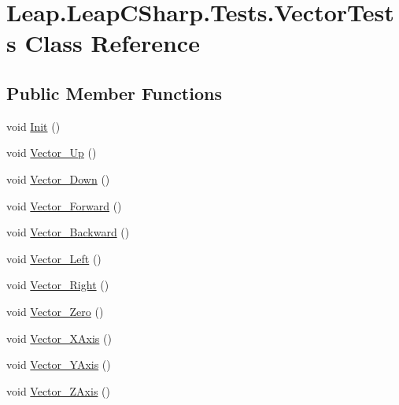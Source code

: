 \hypertarget{class_leap_1_1_leap_c_sharp_1_1_tests_1_1_vector_tests}{}\section{Leap.\+Leap\+C\+Sharp.\+Tests.\+Vector\+Tests Class Reference}
\label{class_leap_1_1_leap_c_sharp_1_1_tests_1_1_vector_tests}
\subsection*{Public Member Functions}
\begin{DoxyCompactItemize}
\item 
void \mbox{\hyperlink{class_leap_1_1_leap_c_sharp_1_1_tests_1_1_vector_tests_a0c48c6a5ba72b700beb775313918c769}{Init}} ()
\item 
void \mbox{\hyperlink{class_leap_1_1_leap_c_sharp_1_1_tests_1_1_vector_tests_af9b57edc72c60333e898e660a0e0591e}{Vector\+\_\+\+Up}} ()
\item 
void \mbox{\hyperlink{class_leap_1_1_leap_c_sharp_1_1_tests_1_1_vector_tests_a6159c18ccab6432095cc32bdb920ca13}{Vector\+\_\+\+Down}} ()
\item 
void \mbox{\hyperlink{class_leap_1_1_leap_c_sharp_1_1_tests_1_1_vector_tests_a6ea9133db5ccbd844a43c021847ca18b}{Vector\+\_\+\+Forward}} ()
\item 
void \mbox{\hyperlink{class_leap_1_1_leap_c_sharp_1_1_tests_1_1_vector_tests_a9da5309cbab72e326fb4804d30359474}{Vector\+\_\+\+Backward}} ()
\item 
void \mbox{\hyperlink{class_leap_1_1_leap_c_sharp_1_1_tests_1_1_vector_tests_a33f5f18600b7beafa3839a9710e280f2}{Vector\+\_\+\+Left}} ()
\item 
void \mbox{\hyperlink{class_leap_1_1_leap_c_sharp_1_1_tests_1_1_vector_tests_a6ca70e2a038ac4363be3ee8190d81858}{Vector\+\_\+\+Right}} ()
\item 
void \mbox{\hyperlink{class_leap_1_1_leap_c_sharp_1_1_tests_1_1_vector_tests_a10859fd21599d27a97aa2d435d07917f}{Vector\+\_\+\+Zero}} ()
\item 
void \mbox{\hyperlink{class_leap_1_1_leap_c_sharp_1_1_tests_1_1_vector_tests_aeeb569f385d4318f01ee10d3abacecee}{Vector\+\_\+\+X\+Axis}} ()
\item 
void \mbox{\hyperlink{class_leap_1_1_leap_c_sharp_1_1_tests_1_1_vector_tests_a62558a7648adceef4485d9960aacf2a3}{Vector\+\_\+\+Y\+Axis}} ()
\item 
void \mbox{\hyperlink{class_leap_1_1_leap_c_sharp_1_1_tests_1_1_vector_tests_ab50fa4d4319b0a65fefff7ad9d7658be}{Vector\+\_\+\+Z\+Axis}} ()

\end{DoxyCompactItemize}

